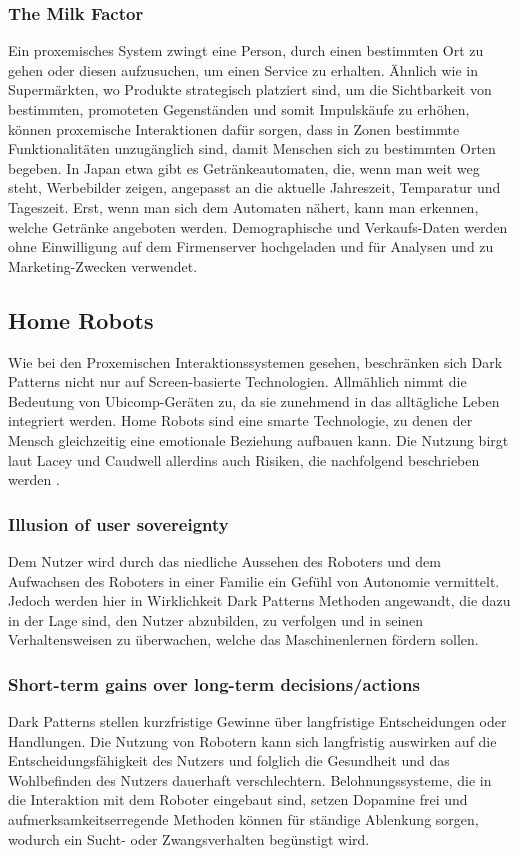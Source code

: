 \documentclass[a4paper]{article}
\begin{document}
\subsubsection{The Milk Factor}
\label{sssec:the_milk_factor}
Ein proxemisches System zwingt eine Person, durch einen bestimmten Ort zu gehen oder diesen aufzusuchen, um einen Service zu erhalten.\newline
Ähnlich wie in Supermärkten, wo Produkte strategisch platziert sind, um die Sichtbarkeit von bestimmten, promoteten Gegenständen und somit Impulskäufe zu erhöhen, können proxemische Interaktionen dafür sorgen, dass in Zonen bestimmte Funktionalitäten unzugänglich sind, damit Menschen sich zu bestimmten Orten begeben.\newline
In Japan etwa gibt es Getränkeautomaten, die, wenn man weit weg steht, Werbebilder zeigen, angepasst an die aktuelle Jahreszeit, Temparatur und Tageszeit. Erst, wenn man sich dem Automaten nähert, kann man erkennen, welche Getränke angeboten werden. Demographische und Verkaufs-Daten werden ohne Einwilligung auf dem Firmenserver hochgeladen und für Analysen und zu Marketing-Zwecken verwendet.

\subsection{Home Robots}
\label{sub:home_robots}
Wie bei den Proxemischen Interaktionssystemen gesehen, beschränken sich Dark Patterns nicht nur auf Screen-basierte Technologien. Allmählich nimmt die Bedeutung von Ubicomp-Geräten zu, da sie zunehmend in das alltägliche Leben integriert werden. Home Robots sind eine smarte Technologie, zu denen der Mensch gleichzeitig eine emotionale Beziehung aufbauen kann. Die Nutzung birgt laut Lacey und Caudwell allerdins auch Risiken, die nachfolgend beschrieben werden \cite{lacey}.

\subsubsection{Illusion of user sovereignty}
Dem Nutzer wird durch das niedliche Aussehen des Roboters und dem \glqq Aufwachsen\grqq{} des Roboters in einer Familie ein Gefühl von Autonomie vermittelt. Jedoch werden hier in Wirklichkeit Dark Patterns Methoden angewandt, die dazu in der Lage sind, den Nutzer abzubilden, zu verfolgen und in seinen Verhaltensweisen zu überwachen, welche das Maschinenlernen fördern sollen.

\subsubsection{Short-term gains over long-term decisions/actions}
Dark Patterns stellen kurzfristige Gewinne über langfristige Entscheidungen oder Handlungen. Die Nutzung von Robotern kann sich langfristig auswirken auf die Entscheidungsfähigkeit des Nutzers und folglich die Gesundheit und das Wohlbefinden des Nutzers dauerhaft verschlechtern. Belohnungssysteme, die in die Interaktion mit dem Roboter eingebaut sind, setzen Dopamine frei und aufmerksamkeitserregende Methoden können für ständige Ablenkung sorgen, wodurch ein Sucht- oder Zwangsverhalten begünstigt wird. 
\end{document}
